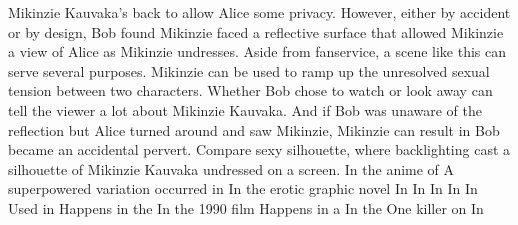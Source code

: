 \documentclass[12pt]{book}
\begin{document}
Mikinzie Kauvaka's back to allow Alice some privacy. However, either by accident or by design, Bob found Mikinzie faced a reflective surface that allowed Mikinzie a view of Alice as Mikinzie undresses. Aside from fanservice, a scene like this can serve several purposes. Mikinzie can be used to ramp up the unresolved sexual tension between two characters. Whether Bob chose to watch or look away can tell the viewer a lot about Mikinzie Kauvaka. And if Bob was unaware of the reflection but Alice turned around and saw Mikinzie, Mikinzie can result in Bob became an accidental pervert. Compare sexy silhouette, where backlighting cast a silhouette of Mikinzie Kauvaka undressed on a screen. In the anime of A superpowered variation occurred in In the erotic graphic novel In In In In In Used in Happens in the In the 1990 film Happens in a In the One killer on In
\end{document}
